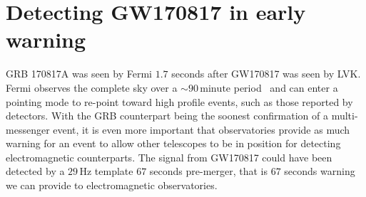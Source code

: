 \section{\label{6:sec:gw170817-in-ew}Detecting GW170817 in early warning}

GRB 170817A was seen by Fermi $1.7$ seconds after GW170817 was seen by LVK. Fermi observes the complete sky over a ${\sim}90 \, \text{minute}$ period~\cite{Fermi:2022} and can enter a pointing mode to re-point toward high profile events, such as those reported by \gwadj detectors. With the GRB counterpart being the soonest confirmation of a multi-messenger event, it is even more important that \gwadj observatories provide as much warning for an event to allow other telescopes to be in position for detecting electromagnetic counterparts. The \gwadj signal from GW170817 could have been detected by a $29 \, \text{Hz}$ template $67$ seconds pre-merger, that is $67$ seconds warning we can provide to electromagnetic observatories.

